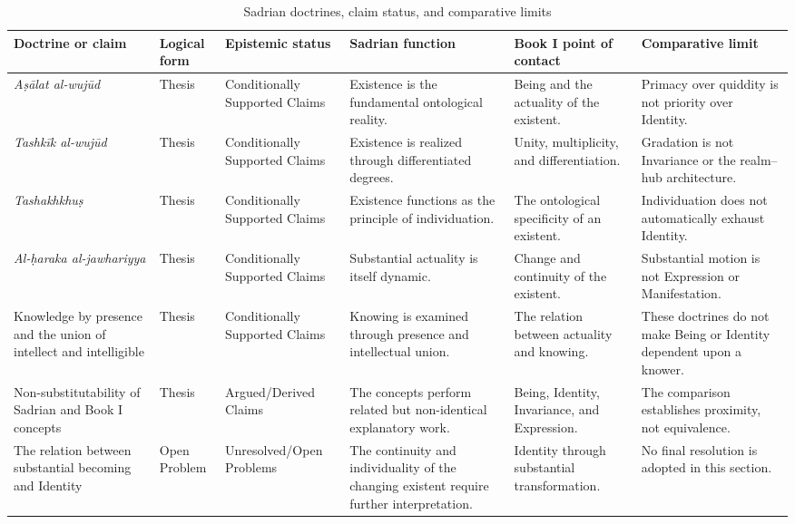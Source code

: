 \begin{table}[htbp]
\centering
\footnotesize
\renewcommand{\arraystretch}{1.3}
\caption{Sadrian doctrines, claim status, and comparative limits}
\label{tab:ch08_s17_sadrian_doctrines}

\begin{tabular}{
    p{}
    p{}
    p{}
    p{}
    p{}
    p{}
}
\toprule
\textbf{Doctrine or claim}
&
\textbf{Logical form}
&
\textbf{Epistemic status}
&
\textbf{Sadrian function}
&
\textbf{Book I point of contact}
&
\textbf{Comparative limit}
\\
\midrule

\textit{Aṣālat al-wujūd}
&
Thesis
&
Conditionally Supported Claims
&
Existence is the fundamental ontological reality.
&
Being and the actuality of the existent.
&
Primacy over quiddity is not priority over Identity.
\\

\textit{Tashkīk al-wujūd}
&
Thesis
&
Conditionally Supported Claims
&
Existence is realized through differentiated degrees.
&
Unity, multiplicity, and differentiation.
&
Gradation is not Invariance or the realm--hub architecture.
\\

\textit{Tashakhkhuṣ}
&
Thesis
&
Conditionally Supported Claims
&
Existence functions as the principle of individuation.
&
The ontological specificity of an existent.
&
Individuation does not automatically exhaust Identity.
\\

\textit{Al-ḥaraka al-jawhariyya}
&
Thesis
&
Conditionally Supported Claims
&
Substantial actuality is itself dynamic.
&
Change and continuity of the existent.
&
Substantial motion is not Expression or Manifestation.
\\

Knowledge by presence and the union of intellect and intelligible
&
Thesis
&
Conditionally Supported Claims
&
Knowing is examined through presence and intellectual union.
&
The relation between actuality and knowing.
&
These doctrines do not make Being or Identity dependent upon a knower.
\\

Non-substitutability of Sadrian and Book I concepts
&
Thesis
&
Argued/Derived Claims
&
The concepts perform related but non-identical explanatory work.
&
Being, Identity, Invariance, and Expression.
&
The comparison establishes proximity, not equivalence.
\\

The relation between substantial becoming and Identity
&
Open Problem
&
Unresolved/Open Problems
&
The continuity and individuality of the changing existent require further interpretation.
&
Identity through substantial transformation.
&
No final resolution is adopted in this section.
\\

\bottomrule
\end{tabular}
\end{table}

